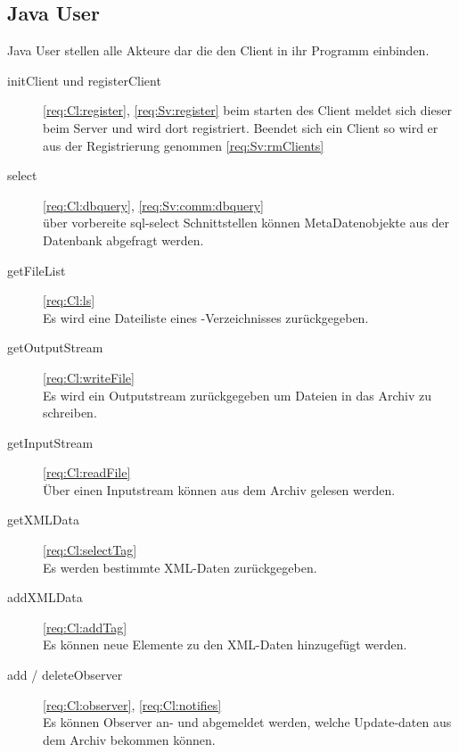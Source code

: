 \subsection{Java User} \label{design:frontend:usecase:user}
Java User stellen alle Akteure dar die den Client in ihr Programm einbinden. 

\begin{description}
	\item [initClient und registerClient]
		\ref{req:Cl:register}, \ref{req:Sv:register}
		beim starten des Client meldet sich dieser beim Server und wird dort registriert.
		Beendet sich ein Client so wird er aus der Registrierung genommen \ref{req:Sv:rmClients}
	\item [select]
		\ref{req:Cl:dbquery}, \ref{req:Sv:comm:dbquery} \\
		über vorbereite sql-select Schnittstellen können MetaDatenobjekte aus der
		Datenbank abgefragt werden.
	\item [getFileList]
		\ref{req:Cl:ls} \\
		Es wird eine Dateiliste eines \arc-Verzeichnisses zurückgegeben.
	\item [getOutputStream]
		\ref{req:Cl:writeFile} \\
		Es wird ein Outputstream zurückgegeben um Dateien in das Archiv zu schreiben.
	\item [getInputStream]
		\ref{req:Cl:readFile} \\
		Über einen Inputstream können aus dem Archiv gelesen werden.
	\item [getXMLData]
		\ref{req:Cl:selectTag} \\
		Es werden bestimmte XML-Daten zurückgegeben.
	\item [addXMLData]
		\ref{req:Cl:addTag} \\
		Es können neue Elemente zu den XML-Daten hinzugefügt werden.
	\item [add / deleteObserver]
		\ref{req:Cl:observer}, \ref{req:Cl:notifies} \\
		Es können Observer an- und abgemeldet werden, welche Update-daten aus dem
		Archiv bekommen können.
\end{description}

